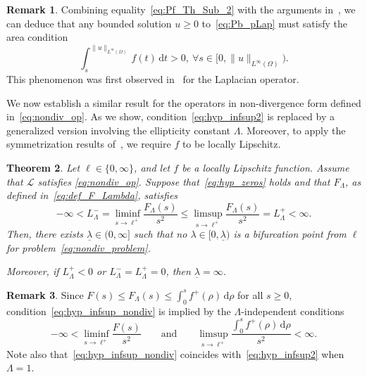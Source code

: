 \documentclass[10pt,twoside,english,reqno,a4paper]{amsart}
\theoremstyle{plain}
\theoremstyle{plain}
\newtheorem{theorem}{Theorem}[section]
\theoremstyle{definition}
\newtheorem{remark}[theorem]{Remark}
\theoremstyle{remark}
\numberwithin{equation}{section}
\def\lio{{L^{\infty}(\Omega)}}
\newcommand{\oLL}{L^+_\Lambda}
\newcommand{\uLL}{L^-_\Lambda}
\begin{document}
\begin{remark} 
Combining equality~\eqref{eq:Pf_Th_Sub_2} with the arguments in~\cite[Section~3]{DS87}, we can deduce that any bounded solution $u\geq 0$ to~\eqref{eq:Pb_pLap} must satisfy the area condition
\[
\int_s^{\|u\|_\lio} f(t)\, \mathrm{d}t >0,\ \forall s\in [0,\|u\|_\lio).
\]
This phenomenon was first observed in~\cite{CS87, DS87} for the Laplacian operator.
\end{remark}

We now establish a similar result for the operators in non-divergence form defined in~\eqref{eq:nondiv_op}. As we show, condition~\eqref{eq:hyp_infsup2} is replaced by a generalized version involving the ellipticity constant $\Lambda$. Moreover, to apply the symmetrization results of~\cite{DS07}, we require $f$ to be locally Lipschitz.


\begin{theorem}
Let $\ell\in\{0,\infty\}$, and let $f$ be a locally Lipschitz function. Assume that $\mathcal{L}$ satisfies 
\eqref{eq:nondiv_op}. Suppose that~\eqref{eq:hyp_zeros} holds and that $F_\Lambda$, as defined in~\eqref{eq:def_F_Lambda}, satisfies
\begin{equation}
\label{eq:hyp_infsup_nondiv}
    -\infty < \uLL = \liminf_{s\to \ell^+} \frac{F_\Lambda(s)}{s^2} 
    \leq \limsup_{s\to \ell^+} \frac{F_\Lambda(s)}{s^2} = \oLL < \infty.
\end{equation}
Then, there exists $\underline{\lambda}\in (0,\infty]$ such that 
no $\lambda\in [0, \underline{\lambda})$ is a bifurcation point 
from $\ell$ for problem~\eqref{eq:nondiv_problem}.

Moreover, if $\oLL < 0$ or $\uLL = \oLL = 0$, then $\underline{\lambda}=\infty$.
\end{theorem}

\begin{remark}
Since $F(s) \leq F_\Lambda(s) \leq \int_0^s f^+(\rho)\,\mathrm{d}\rho$ 
for all $s\geq 0$, condition~\eqref{eq:hyp_infsup_nondiv} is implied by 
the $\Lambda$-independent conditions
\[
-\infty < \liminf_{s\to \ell^+} \frac{F(s)}{s^2} 
\qquad\text{and}\qquad 
\limsup_{s\to \ell^+} \frac{\int_0^s f^+(\rho)\,\mathrm{d}\rho}{s^2} < \infty.
\]
Note also that~\eqref{eq:hyp_infsup_nondiv} coincides with~\eqref{eq:hyp_infsup2} when $\Lambda=1$.
\end{remark}
\end{document}
